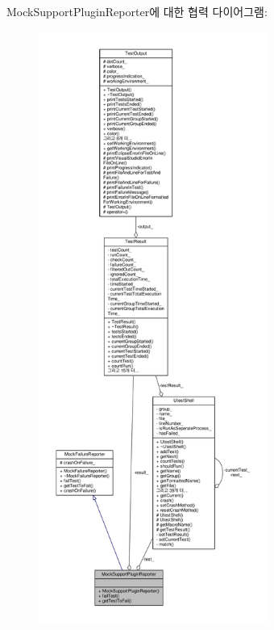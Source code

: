 Mock\+Support\+Plugin\+Reporter에 대한 협력 다이어그램\+:
\nopagebreak
\begin{figure}[H]
\begin{center}
\leavevmode
\includegraphics[height=550pt]{class_mock_support_plugin_reporter__coll__graph}
\end{center}
\end{figure}
